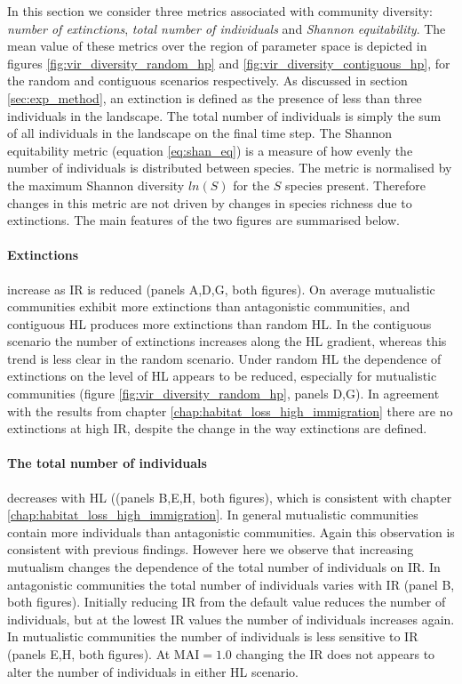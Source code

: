 In this section we consider three metrics associated with community diversity: \emph{number of extinctions}, \emph{total number of individuals} and \emph{Shannon equitability}. The mean value of these metrics over the region of parameter space is depicted in figures \ref{fig:vir_diversity_random_hp} and \ref{fig:vir_diversity_contiguous_hp}, for the random and contiguous scenarios respectively. As discussed in section \ref{sec:exp_method}, an extinction is defined as the presence of less than three individuals in the landscape. The total number of individuals is simply the sum of all individuals in the landscape on the final time step. The Shannon equitability metric (equation \eqref{eq:shan_eq}) is a measure of how evenly the number of individuals is distributed between species. The metric is normalised by the maximum Shannon diversity $ln(S)$ for the $S$ species present. Therefore changes in this metric are not driven by changes in species richness due to extinctions. The main features of the two figures are summarised below.

\paragraph*{Extinctions} increase as IR is reduced (panels A,D,G, both figures). On average mutualistic communities exhibit more extinctions than antagonistic communities, and contiguous HL produces more extinctions than random HL. In the contiguous scenario the number of extinctions increases along the HL gradient, whereas this trend is less clear in the random scenario. Under random HL the dependence of extinctions  on the level of HL  appears to be reduced, especially for mutualistic communities (figure \ref{fig:vir_diversity_random_hp}, panels D,G). In agreement with the results from chapter \ref{chap:habitat_loss_high_immigration} there are no extinctions at high IR, despite the change in the way extinctions are defined. 

\paragraph*{The total number of individuals} decreases with HL ((panels B,E,H, both figures), which is consistent with chapter \ref{chap:habitat_loss_high_immigration}. In general mutualistic communities contain more individuals than antagonistic communities. Again this observation is consistent with previous findings. However here we observe that increasing mutualism changes the dependence of the total number of individuals on IR. In antagonistic communities the total number of individuals varies with IR (panel B, both figures). Initially reducing IR from the default value reduces the number of individuals, but at the lowest IR values the number of individuals increases again. In mutualistic communities the number of individuals is less sensitive to IR (panels E,H, both figures). At MAI$ =1.0$ changing the IR does not appears to alter the number of individuals in either HL scenario.

